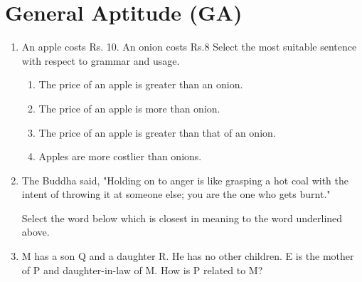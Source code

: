 \documentclass[journal]{IEEEtran}
\begin{document}
    

\section*{General Aptitude (GA)}

\begin{enumerate}              
    \item An apple costs Rs. 10. An onion costs Rs.8 Select the most suitable sentence with respect to grammar and usage.
    
    \begin{enumerate}              
   
        \item The price of an apple is greater than an onion.
        \item The price of an apple is more than onion.
        \item The price of an apple is greater than that of an onion.
        \item Apples are more costlier than onions.
      
     \end{enumerate}              
    
    \hfill{}
    
    \item The Buddha said, "Holding on to anger is like grasping a hot coal with the intent of throwing it at someone else; you are the one who gets burnt."
    
    Select the word below which is closest in meaning to the word underlined above.
    
    \begin{enumerate}  \end{enumerate}              
    
    \hfill{}
    
    \item M has a son Q and a daughter R. He has no other children. E is the mother of P and daughter-in-law of M. How is P related to M?
    

\end{enumerate}
\end{document}
